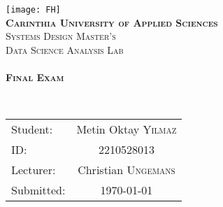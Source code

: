 \begin{titlepage}
    \begin{center}
        \texttt{[image: FH]}\\[1.85cm]

        \textbf{\textsc{\Large Carinthia University of Applied Sciences}}\\[1.85cm]

        \textsc{\Large Systems Design Master's}\\[1.85cm]
        \textsc{\Large Data Science Analysis Lab}\\[1.85cm]

        \HRule \\[5mm]

        { \LARGE \bfseries \textsc{Final Exam}}

        \HRule\\[1cm]

        \vspace{2cm}

        	\begin{table}[H]
        		\centering
        		\begin{tabular}{|l|c|}
        			\toprule
        			Student: & Metin Oktay \textsc{Yilmaz} \\
        			ID: & 2210528013   	\\
        			Lecturer: & Christian  \textsc{Ungemans}  \\
        			Submitted: & {\large \today}  	\\
        			\bottomrule
        		\end{tabular}
        	\end{table}
    \end{center}
\end{titlepage}